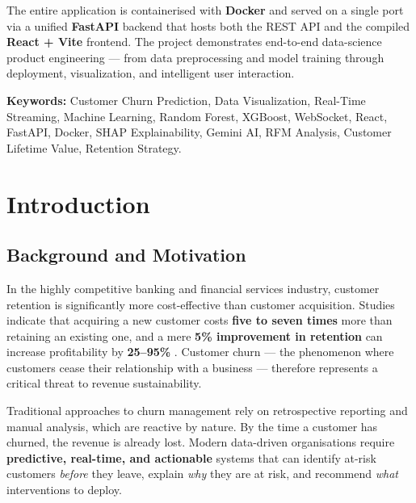 \documentclass[12pt, a4paper]{report}
\begin{document}
The entire application is containerised with \textbf{Docker} and served on a single port via a unified \textbf{FastAPI} backend that hosts both the REST API and the compiled \textbf{React + Vite} frontend. The project demonstrates end-to-end data-science product engineering --- from data preprocessing and model training through deployment, visualization, and intelligent user interaction.

\vspace{0.5cm}
\noindent\textbf{Keywords:} Customer Churn Prediction, Data Visualization, Real-Time Streaming, Machine Learning, Random Forest, XGBoost, WebSocket, React, FastAPI, Docker, SHAP Explainability, Gemini AI, RFM Analysis, Customer Lifetime Value, Retention Strategy.

\tableofcontents
\listoffigures
\listoftables

\chapter{Introduction}

\section{Background and Motivation}

In the highly competitive banking and financial services industry, customer retention is significantly more cost-effective than customer acquisition. Studies indicate that acquiring a new customer costs \textbf{five to seven times} more than retaining an existing one, and a mere \textbf{5\% improvement in retention} can increase profitability by \textbf{25--95\%} \cite{reichheld1996loyalty}. Customer churn --- the phenomenon where customers cease their relationship with a business --- therefore represents a critical threat to revenue sustainability.

Traditional approaches to churn management rely on retrospective reporting and manual analysis, which are reactive by nature. By the time a customer has churned, the revenue is already lost. Modern data-driven organisations require \textbf{predictive, real-time, and actionable} systems that can identify at-risk customers \textit{before} they leave, explain \textit{why} they are at risk, and recommend \textit{what} interventions to deploy.
\end{document}
